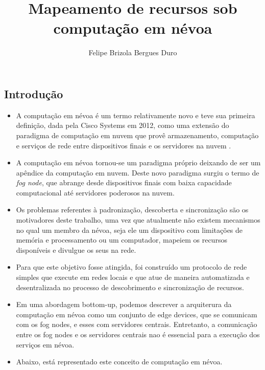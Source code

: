 \documentclass[a0,portrait]{lab-poster}
\title{Mapeamento de recursos sob computação em névoa}
\author{Felipe Brizola Bergues Duro}
\begin{document}
\maketitle


\begin{multicols}{2} 
\section*{Introdução}
\Large
\justifying
\begin{itemize}

\item A computação em névoa é um termo relativamente novo e teve sua primeira definição, dada pela Cisco Systems em 2012, como uma extensão do paradigma de computação em nuvem que provê armazenamento, computação e serviços de rede entre dispositivos finais e os servidores na nuvem \cite{DBLP:journals/corr/RomanLM16}.
\item A computação em névoa tornou-se um paradigma próprio deixando de ser um apêndice da computação em nuvem. Deste novo paradigma surgiu o termo de \textit{fog node}, que abrange desde dispositivos finais com baixa capacidade computacional até servidores poderosos na nuvem.
\item Os problemas referentes à padronização, descoberta e sincronização são os motivadores deste trabalho, uma vez que atualmente não existem mecanismos no qual um membro da névoa, seja ele um dispositivo com limitações de memória e processamento ou um computador, mapeiem os recursos disponíveis e divulgue os seus na rede.
\item Para que este objetivo fosse atingida, foi construído um protocolo de rede simples que execute em redes locais e que atue de maneira automatizada e desentralizada no processo de descobrimento e sincronização de recursos.
\item Em uma abordagem bottom-up, podemos descrever a arquiterura da computação em névoa como um conjunto de edge devices, que se comunicam com os fog nodes, e esses com servidores centrais.
Entretanto, a comunicação entre os fog nodes e os servidores centrais nao é essencial para a execução dos serviços em névoa.
\item Abaixo, está representado este conceito de computação em névoa.



\end{itemize}
\end{multicols}
\end{document}
